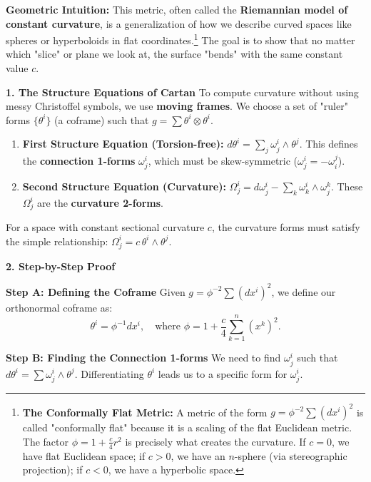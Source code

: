 \begin{solution}
\textbf{Geometric Intuition:} This metric, often called the \textbf{Riemannian model of constant curvature}, is a generalization of how we describe curved spaces like spheres or hyperboloids in flat coordinates.\footnote{\textbf{The Conformally Flat Metric:} A metric of the form $g = \phi^{-2} \sum (dx^i)^2$ is called "conformally flat" because it is a scaling of the flat Euclidean metric. The factor $\phi = 1 + \frac{c}{4}r^2$ is precisely what creates the curvature. If $c=0$, we have flat Euclidean space; if $c > 0$, we have an $n$-sphere (via stereographic projection); if $c < 0$, we have a hyperbolic space.} The goal is to show that no matter which "slice" or plane we look at, the surface "bends" with the same constant value $c$.

\textbf{1. The Structure Equations of Cartan}
To compute curvature without using messy Christoffel symbols, we use \textbf{moving frames}. We choose a set of "ruler" forms $\{\theta^i\}$ (a coframe) such that $g = \sum \theta^i \otimes \theta^i$.
\begin{enumerate}
    \item \textbf{First Structure Equation (Torsion-free):} $d\theta^i = \sum_j \omega^i_j \wedge \theta^j$. This defines the \textbf{connection 1-forms} $\omega^i_j$, which must be skew-symmetric ($\omega^i_j = -\omega^j_i$).
    \item \textbf{Second Structure Equation (Curvature):} $\Omega^i_j = d\omega^i_j - \sum_k \omega^i_k \wedge \omega^k_j$. These $\Omega^i_j$ are the \textbf{curvature 2-forms}.
\end{enumerate}
For a space with constant sectional curvature $c$, the curvature forms must satisfy the simple relationship: $\Omega^i_j = c \, \theta^i \wedge \theta^j$.

\textbf{2. Step-by-Step Proof}

\textbf{Step A: Defining the Coframe}
Given $g = \phi^{-2} \sum (dx^i)^2$, we define our orthonormal coframe as:
\[ \theta^i = \phi^{-1} dx^i, \quad \text{where } \phi = 1 + \frac{c}{4} \sum_{k=1}^n (x^k)^2. \]

\textbf{Step B: Finding the Connection 1-forms}
We need to find $\omega^i_j$ such that $d\theta^i = \sum \omega^i_j \wedge \theta^j$. Differentiating $\theta^i$ leads us to a specific form for $\omega^i_j$.


\end{solution}
